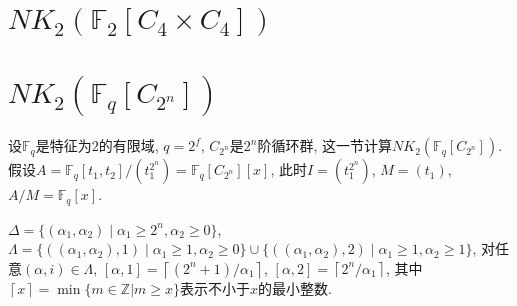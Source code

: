 \section{$NK_2(\mathbb{F}_2[C_4\times C_4])$} %
\label{sec:NK_2(F_2[C_4C_4])}






























































\section{$NK_2(\mathbb{F}_q[C_{2^n}])$} %
\label{sec:NK_2(F_q[C_{2^n}])}

设$\mathbb{F}_q$是特征为$2$的有限域, $q=2^f$, $C_{2^n}$是$2^n$阶循环群, 这一节计算$NK_2(\mathbb{F}_q[C_{2^n}])$. 假设$A=\mathbb{F}_q[t_1,t_2]/(t_1^{2^n})=\mathbb{F}_q[C_{2^n}][x]$, 此时$I=(t_1^{2^n})$, $M=(t_1)$, $A/M=\mathbb{F}_q[x]$. 

\begin{lemma}
	$\Delta =\{(\alpha_1,\alpha_2)\mid \alpha_1\geq 2^n, \alpha_2 \geq 0\}$, $\Lambda = \{((\alpha_1,\alpha_2),1) \mid \alpha_1\geq 1, \alpha_2\geq 0\}\cup \{((\alpha_1,\alpha_2),2) \mid \alpha_1\geq 1, \alpha_2\geq 1\}$, 对任意$(\alpha,i)\in \Lambda$, $[\alpha,1]=\left \lceil (2^n+1)/\alpha_1 \right \rceil$, $[\alpha,2]=\left \lceil 2^n/\alpha_1 \right \rceil$, 其中$\left \lceil x \right \rceil=\min \{m\in \mathbb{Z}|m\geq x\}$表示不小于$x$的最小整数. 
\end{lemma}

